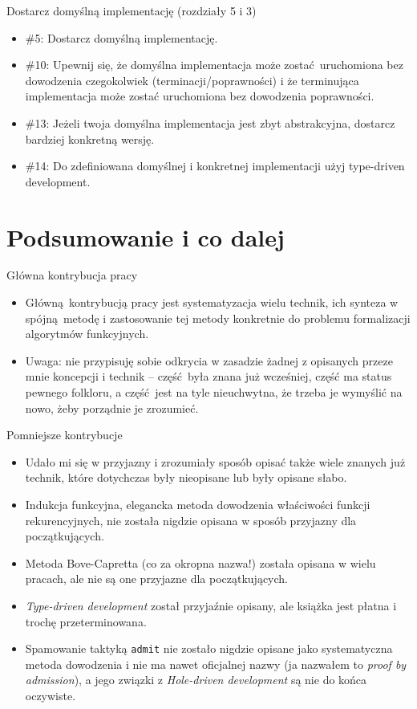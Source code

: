 \documentclass{beamer}
\begin{document}
\begin{frame}{Dostarcz domyślną implementację (rozdziały 5 i 3)}
\begin{itemize}
	\item \#5: Dostarcz domyślną implementację.
	\item \#10: Upewnij się, że domyślna implementacja może zostać uruchomiona bez dowodzenia czegokolwiek (terminacji/poprawności) i że terminująca implementacja może zostać uruchomiona bez dowodzenia poprawności.
	\item \#13: Jeżeli twoja domyślna implementacja jest zbyt abstrakcyjna, dostarcz bardziej konkretną wersję.
	\item \#14: Do zdefiniowana domyślnej i konkretnej implementacji użyj type-driven development.
\end{itemize}
\end{frame}

\section{Podsumowanie i co dalej}

\begin{frame}{Główna kontrybucja pracy}
\begin{itemize}
	\item Główną kontrybucją pracy jest systematyzacja wielu technik, ich synteza w spójną metodę i zastosowanie tej metody konkretnie do problemu formalizacji algorytmów funkcyjnych.
	\item Uwaga: nie przypisuję sobie odkrycia w zasadzie żadnej z opisanych przeze mnie koncepcji i technik -- część była znana już wcześniej, część ma status pewnego folkloru, a część jest na tyle nieuchwytna, że trzeba je wymyślić na nowo, żeby porządnie je zrozumieć.
\end{itemize}
\end{frame}

\begin{frame}{Pomniejsze kontrybucje}
\begin{itemize}
	\item Udało mi się w przyjazny i zrozumiały sposób opisać także wiele znanych już technik, które dotychczas były nieopisane lub były opisane słabo.
	\item Indukcja funkcyjna, elegancka metoda dowodzenia właściwości funkcji rekurencyjnych, nie została nigdzie opisana w sposób przyjazny dla początkujących.
	\item Metoda Bove-Capretta (co za okropna nazwa!) została opisana w wielu pracach, ale nie są one przyjazne dla początkujących.
	\item \textit{Type-driven development} został przyjaźnie opisany, ale książka jest płatna i trochę przeterminowana.
	\item Spamowanie taktyką \texttt{admit} nie zostało nigdzie opisane jako systematyczna metoda dowodzenia i nie ma nawet oficjalnej nazwy (ja nazwałem to \textit{proof by admission}), a jego związki z \textit{Hole-driven development} są nie do końca oczywiste.
\end{itemize}
\end{frame}
\end{document}
